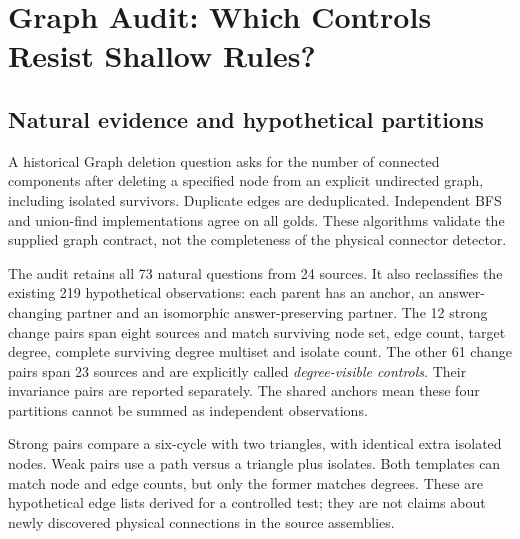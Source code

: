 \documentclass[10pt,twocolumn,letterpaper]{article}
\begin{document}
\section{Graph Audit: Which Controls Resist Shallow Rules?}
\subsection{Natural evidence and hypothetical partitions}
A historical Graph deletion question asks for the number of connected
components after deleting a specified node from an explicit undirected
graph, including isolated survivors. Duplicate edges are deduplicated.
Independent BFS and union-find implementations agree on all golds.
These algorithms validate the supplied graph contract, not the
completeness of the physical connector detector.

The audit retains all 73 natural questions from 24 sources. It also
reclassifies the existing 219 hypothetical observations: each parent
has an anchor, an answer-changing partner and an isomorphic
answer-preserving partner. The 12 strong change pairs span eight
sources and match surviving node set, edge count, target degree,
complete surviving degree multiset and isolate count. The other
61 change pairs span 23 sources and are explicitly called
\emph{degree-visible controls}. Their invariance pairs are reported
separately. The shared anchors mean these four partitions cannot
be summed as independent observations.

Strong pairs compare a six-cycle with two triangles, with identical
extra isolated nodes. Weak pairs use a path versus a triangle plus
isolates. Both templates can match node and edge counts, but only the
former matches degrees. These are hypothetical edge lists derived
for a controlled test; they are not claims about newly discovered
physical connections in the source assemblies.

\begin{table}[t]
\centering\small
\caption{Computed algorithmic evidence, in correct items or both-correct
pairs. Natural lookups are fitted separately from hypothetical lookups,
always holding out the entire test source. Strong change is the primary
proof of concept; degree-visible controls cannot support the same claim.
Strong invariance reuses anchors. These are algorithm outputs, not
learned-model results. Source intervals and every strong pair appear
in the scientific supplement and machine-readable audit.}
\label{tab:graph}

\end{table}
\end{document}
